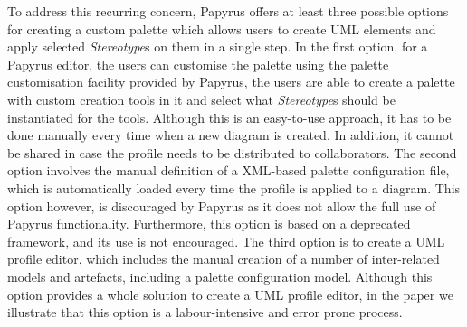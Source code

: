 To address this recurring concern, Papyrus offers at least three possible options for creating a custom palette which allows users to create UML elements and apply selected \textit{Stereotype}s on them in a single step. 
In the first option, for a Papyrus editor, the users can customise the palette using the palette customisation facility provided by Papyrus, the users are able to create a palette with custom creation tools in it and select what \textit{Stereotype}s should be instantiated for the tools. 
Although this is an easy-to-use approach, it has to be done manually every time when a new diagram is created.
In addition, it cannot be shared in case the profile needs to be distributed to collaborators. 
The second option involves the manual definition of a XML-based palette configuration file, which is automatically loaded every time the profile is applied to a diagram. 
This option however, is discouraged by Papyrus as it does not allow the full use of Papyrus functionality.
Furthermore, this option is based on a deprecated framework, and its use is not encouraged. 
The third option is to create a UML profile editor, which includes the manual creation of a number of inter-related models and artefacts, including a palette configuration model. 
Although this option provides a whole solution to create a UML profile editor, in the paper we illustrate that this option is a labour-intensive and error prone process.


